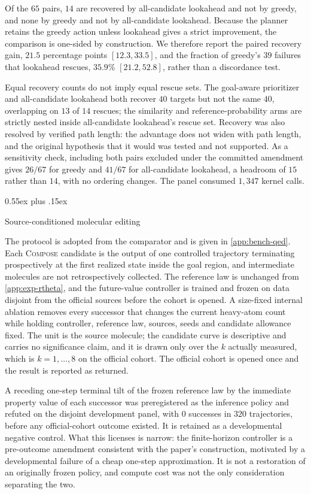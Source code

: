 \documentclass{article}
\makeatletter
\theoremstyle{definition}
\theoremstyle{remark}
\newcommand{\method}{\textsc{Compose}\xspace}
\def\subsection{\@startsection{subsection}{2}{\z@}{-1.2ex plus -0.4ex minus -.2ex}%
  {0.55ex plus .15ex}{\normalsize\sc\raggedright}}
\makeatother
\begin{document}
Of the $65$ pairs, $14$ are recovered by all-candidate lookahead and not by greedy, and none by greedy and not by all-candidate lookahead. Because the planner retains the greedy action unless lookahead gives a strict improvement, the comparison is one-sided by construction. We therefore report the paired recovery gain, $21.5$ percentage points $[12.3,33.5]$, and the fraction of greedy's $39$ failures that lookahead rescues, $35.9\%$ $[21.2,52.8]$, rather than a discordance test.

Equal recovery counts do not imply equal rescue sets. The goal-aware prioritizer and all-candidate lookahead both recover $40$ targets but not the same $40$, overlapping on $13$ of $14$ rescues; the similarity and reference-probability arms are strictly nested inside all-candidate lookahead's rescue set. Recovery was also resolved by verified path length: the advantage does not widen with path length, and the original hypothesis that it would was tested and not supported. As a sensitivity check, including both pairs excluded under the committed amendment gives $26/67$ for greedy and $41/67$ for all-candidate lookahead, a headroom of $15$ rather than $14$, with no ordering changes. The panel consumed $1{,}347$ kernel calls.

\subsection{Source-conditioned molecular editing}
\label{app:exp-jin}

The protocol is adopted from the comparator and is given in \cref{app:bench-qed}. Each \method{} candidate is the output of one controlled trajectory terminating prospectively at the first realized state inside the goal region, and intermediate molecules are not retrospectively collected. The reference law is unchanged from \cref{app:exp-rtheta}, and the future-value controller is trained and frozen on data disjoint from the official sources before the cohort is opened. A size-fixed internal ablation removes every successor that changes the current heavy-atom count while holding controller, reference law, sources, seeds and candidate allowance fixed. The unit is the source molecule; the candidate curve is descriptive and carries no significance claim, and it is drawn only over the $k$ actually measured, which is $k=1,\dots,8$ on the official cohort. The official cohort is opened once and the result is reported as returned.

A receding one-step terminal tilt of the frozen reference law by the immediate property value of each successor was preregistered as the inference policy and refuted on the disjoint development panel, with $0$ successes in $320$ trajectories, before any official-cohort outcome existed. It is retained as a developmental negative control. What this licenses is narrow: the finite-horizon controller is a pre-outcome amendment consistent with the paper's construction, motivated by a developmental failure of a cheap one-step approximation. It is not a restoration of an originally frozen policy, and compute cost was not the only consideration separating the two.
\end{document}
